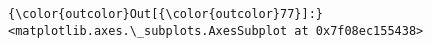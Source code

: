 \documentclass[11pt]{article}
\begin{document}
\begin{Verbatim}[commandchars=\\\{\}]
{\color{outcolor}Out[{\color{outcolor}77}]:} <matplotlib.axes.\_subplots.AxesSubplot at 0x7f08ec155438>
\end{Verbatim}
            
    \begin{center}
    \end{center}
    { \hspace*{\fill} \\}
    

    
    
    
    
\end{document}
